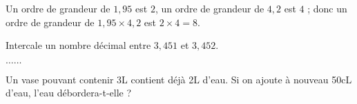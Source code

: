 \begin{pageCours}
\begin{Ex}
Un ordre de grandeur de $1,95$ est $2$, un ordre de grandeur de $4,2$ est $4$ ; donc un ordre de grandeur de $1,95\times4,2$ est $2\times4=8$.
\end{Ex} 



% 

\end{pageCours}



\begin{pageParcoursu} 


Intercale un nombre décimal entre $3,451$ et $3,452$.

$\ldots \ldots$






Un vase pouvant contenir 3L contient déjà 2L d'eau. Si on ajoute à nouveau 50cL d'eau, l'eau débordera-t-elle ?

 
 
\end{pageParcoursu}



